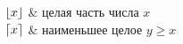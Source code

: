 \begin{longtabu}
  $\lfloor x \rfloor$                & целая часть числа $x$                                        \\
  $\lceil x \rceil$                 & наименьшее целое $y \geqslant x$                             \\



\end{longtabu}
